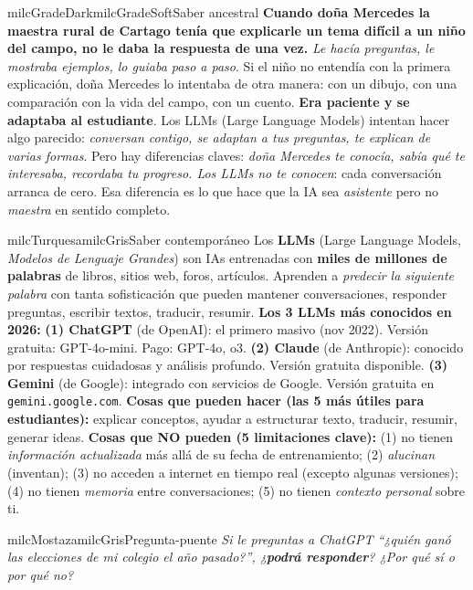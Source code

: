 \documentclass[11pt,letterpaper]{article}
\begin{document}
\begin{softbox}{milcGradeDark}{milcGradeSoft}{Saber ancestral}
\textbf{Cuando doña Mercedes la maestra rural de Cartago tenía que explicarle un tema difícil a un niño del campo, no le daba la respuesta de una vez.} \emph{Le hacía preguntas, le mostraba ejemplos, lo guiaba paso a paso}. Si el niño no entendía con la primera explicación, doña Mercedes lo intentaba de otra manera: con un dibujo, con una comparación con la vida del campo, con un cuento. \textbf{Era paciente y se adaptaba al estudiante}. Los LLMs (Large Language Models) intentan hacer algo parecido: \emph{conversan contigo, se adaptan a tus preguntas, te explican de varias formas}. Pero hay diferencias claves: \emph{doña Mercedes te conocía, sabía qué te interesaba, recordaba tu progreso. Los LLMs no te conocen}: cada conversación arranca de cero. Esa diferencia es lo que hace que la IA sea \emph{asistente} pero no \emph{maestra} en sentido completo.
\end{softbox}

\begin{softbox}{milcTurquesa}{milcGris}{Saber contemporáneo}
Los \textbf{LLMs} (Large Language Models, \emph{Modelos de Lenguaje Grandes}) son IAs entrenadas con \textbf{miles de millones de palabras} de libros, sitios web, foros, artículos. Aprenden a \emph{predecir la siguiente palabra} con tanta sofisticación que pueden mantener conversaciones, responder preguntas, escribir textos, traducir, resumir. \textbf{Los 3 LLMs más conocidos en 2026:} \textbf{(1) ChatGPT} (de OpenAI): el primero masivo (nov 2022). Versión gratuita: GPT-4o-mini. Pago: GPT-4o, o3. \textbf{(2) Claude} (de Anthropic): conocido por respuestas cuidadosas y análisis profundo. Versión gratuita disponible. \textbf{(3) Gemini} (de Google): integrado con servicios de Google. Versión gratuita en \texttt{gemini.google.com}. \textbf{Cosas que pueden hacer (las 5 más útiles para estudiantes):} explicar conceptos, ayudar a estructurar texto, traducir, resumir, generar ideas. \textbf{Cosas que NO pueden (5 limitaciones clave):} (1) no tienen \emph{información actualizada} más allá de su fecha de entrenamiento; (2) \emph{alucinan} (inventan); (3) no acceden a internet en tiempo real (excepto algunas versiones); (4) no tienen \emph{memoria} entre conversaciones; (5) no tienen \emph{contexto personal} sobre ti.
\end{softbox}

\begin{softbox}{milcMostaza}{milcGris}{Pregunta-puente}
\textit{Si le preguntas a ChatGPT \emph{``¿quién ganó las elecciones de mi colegio el año pasado?''}, ¿\textbf{podrá responder}? ¿Por qué sí o por qué no?}
\end{softbox}
\end{document}
